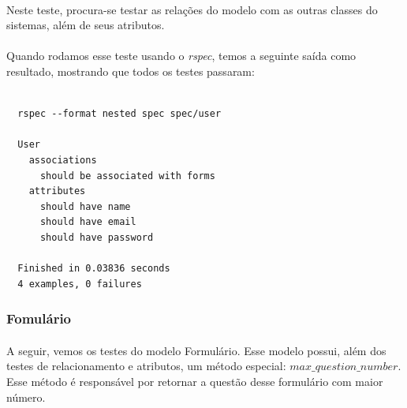 \documentclass[11pt]{article}
\begin{document}
    \paragraph{}
    
    Neste teste, procura-se testar as relações do modelo com as outras 
    classes do sistemas, além de seus atributos.
    
    \paragraph{}
    Quando rodamos esse teste usando o {\em rspec}, temos a seguinte saída
    como resultado, mostrando que todos os testes passaram:
    
    {\scriptsize
      \lstset{language=sh}
      \begin{lstlisting}

  rspec --format nested spec spec/user

  User
    associations
      should be associated with forms
    attributes
      should have name
      should have email
      should have password

  Finished in 0.03836 seconds
  4 examples, 0 failures

      \end{lstlisting}
    }
        
  \clearpage
    
    \subsubsection{Fomulário}
      
    \paragraph{}
    A seguir, vemos os testes do modelo Formulário. Esse modelo possui, além
    dos testes de relacionamento e atributos, um método especial: $max\_question\_number$. 
    \\Esse método é responsável por retornar a questão desse formulário com maior número. 
    
\end{document}
